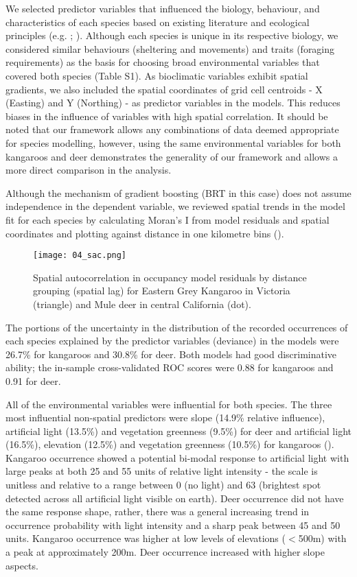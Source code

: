 We selected predictor variables that influenced the biology, behaviour, and characteristics of each species based on existing literature and ecological principles (e.g. \cite{coul10}; \cite{ferg05}). Although each species is unique in its respective biology, we considered similar behaviours (sheltering and movements) and traits (foraging requirements) as the basis for choosing broad environmental variables that covered both species (Table S1).  As bioclimatic variables exhibit spatial gradients, we also included the spatial coordinates of grid cell centroids - X (Easting) and Y (Northing) - as predictor variables in the models.  This reduces biases in the influence of variables with high spatial correlation.  It should be noted that our framework allows any combinations of data deemed appropriate for species modelling, however, using the same environmental variables for both kangaroos and deer demonstrates the generality of our framework and allows a more direct comparison in the analysis.

Although the mechanism of gradient boosting (BRT in this case) does not assume independence in the dependent variable, we reviewed spatial trends in the model fit for each species by calculating Moran’s I from model residuals and spatial coordinates and plotting against distance in one kilometre bins ().

\begin{figure*}[htp]
  \centering
  \texttt{[image: 04\_sac.png]}
  \caption[]{Spatial autocorrelation in occupancy model residuals by distance grouping (spatial lag) for Eastern Grey Kangaroo in Victoria (triangle) and Mule deer in central California (dot).}
  \label{cal_sac_occ}
\end{figure*}

The portions of the uncertainty in the distribution of the recorded occurrences of each species explained by the predictor variables (deviance) in the models were 26.7\% for kangaroos and 30.8\% for deer. Both models had good discriminative ability; the in-sample cross-validated ROC scores were 0.88 for kangaroos and 0.91 for deer.

All of the environmental variables were influential for both species. The three most influential non-spatial predictors were slope (14.9\% relative influence), artificial light (13.5\%) and vegetation greenness (9.5\%) for deer and artificial light (16.5\%), elevation (12.5\%) and vegetation greenness (10.5\%) for kangaroos ().  Kangaroo occurrence showed a potential bi-modal response to artificial light with large peaks at both 25 and 55 units of relative light intensity - the scale is unitless and relative to a range between 0 (no light) and 63 (brightest spot detected across all artificial light visible on earth).  Deer occurrence did not have the same response shape, rather, there was a general increasing trend in occurrence probability with light intensity and a sharp peak between 45 and 50 units. Kangaroo occurrence was higher at low levels of elevations ($<$500m) with a peak at approximately 200m.  Deer occurrence increased with higher slope aspects.

